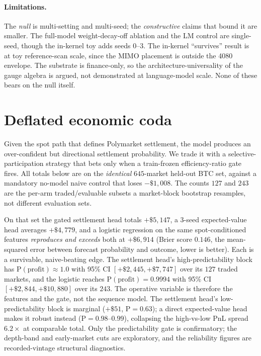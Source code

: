 \documentclass{article}
\begin{document}
\paragraph{Limitations.}
The \emph{null} is multi-setting and multi-seed; the \emph{constructive} claims
that bound it are smaller. The full-model
weight-decay-off ablation and the LM control are single-seed, though the in-kernel
toy adds seeds 0--3. The in-kernel ``survives'' result is at toy reference-scan
scale, since the MIMO placement is outside the 4080 envelope. The substrate is
finance-only, so the architecture-universality of the gauge algebra is argued, not
demonstrated at language-model scale. None of these bears on the null itself.

\section{Deflated economic coda}\label{app:coda}

Given the spot path that defines Polymarket settlement, the model produces an
over-confident but directional settlement probability. We trade it with a
selective-participation strategy that bets only when a train-frozen efficiency-ratio
gate fires. All totals below are on the \emph{identical} $645$-market held-out BTC
set, against a mandatory no-model naive control that loses $-\$1{,}008$. The counts
$127$ and $243$ are the per-arm traded/evaluable subsets a market-block bootstrap
resamples, not different evaluation sets.

On that set the gated settlement head totals $+\$5{,}147$, a 3-seed expected-value
head averages $+\$4{,}779$, and a logistic regression on the same spot-conditioned
features \emph{reproduces and exceeds} both at $+\$6{,}914$ (Brier score $0.146$,
the mean-squared error between forecast probability and outcome, lower is better).
Each is a survivable, naive-beating edge. The settlement head's high-predictability
block has $\mathrm{P(profit)}\approx1.0$ with 95\% CI $[+\$2{,}445,+\$7{,}747]$ over
its $127$ traded markets, and the logistic reaches $\mathrm{P(profit)}=0.9994$ with
95\% CI $[+\$2{,}844,+\$10{,}880]$ over its $243$. The operative variable is
therefore the features and the gate, not the sequence model. The settlement head's
low-predictability block is marginal ($+\$51$, $\mathrm{P}=0.63$); a direct
expected-value head makes it robust instead ($\mathrm{P}=0.98$--$0.99$), collapsing
the high-vs-low PnL spread $6.2\times$ at comparable total. Only the predictability
gate is confirmatory; the depth-band and early-market cuts are exploratory, and the
reliability figures are recorded-vintage structural diagnostics.
\end{document}
